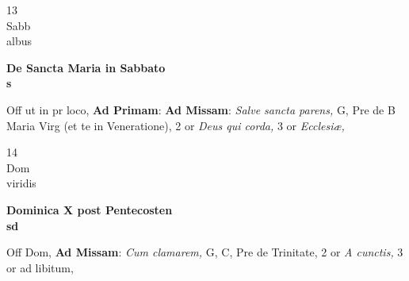 \documentclass[10pt, openany]{book}
\begin{document}
        \begin{center}
            \begin{minipage}{3.5in}
                \vspace{2em}
                \begin{minipage}{0.5in}
                    {\Huge 13} \\
                    {\normalsize Sabb} \\
                    {\normalsize albus}
                \end{minipage}
                \begin{minipage}{3.0in}
                    \textbf{ \large De Sancta Maria in Sabbato \\
                    \textnormal{\normalsize s}} \\ 
                \end{minipage}
                \begin{justify}Off ut in pr loco, \textbf{Ad Primam}: \textbf{Ad Missam}: \textit{Salve sancta parens,} G, Pre de B Maria Virg (et te in Veneratione), 2 or \textit{Deus qui corda,} 3 or \textit{Ecclesiæ,}  
                \end{justify}
            \end{minipage}
        \end{center}
    
        \begin{center}
            \begin{minipage}{3.5in}
                \vspace{2em}
                \begin{minipage}{0.5in}
                    {\Huge 14} \\
                    {\normalsize Dom} \\
                    {\normalsize viridis}
                \end{minipage}
                \begin{minipage}{3.0in}
                    \textbf{ \large Dominica X post Pentecosten \\
                    \textnormal{\normalsize sd}} \\ 
                \end{minipage}
                \begin{justify}Off Dom, \textbf{Ad Missam}: \textit{Cum clamarem,} G, C, Pre de Trinitate, 2 or \textit{A cunctis,} 3 or ad libitum,  
                \end{justify}
            \end{minipage}
        \end{center}
    
\end{document}
